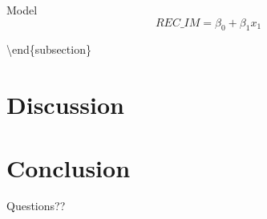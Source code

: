 \documentclass[
  ignorenonframetext,
]{beamer}
\begin{document}
\begin{frame}{Model}
\protect\hypertarget{model}{}
\[ REC\_IM = \beta_0 + \beta_1 x_1 \]

\textbackslash end\{subsection\}
\end{frame}

\hypertarget{discussion}{%
\section{Discussion}\label{discussion}}

\hypertarget{conclusion}{%
\section{Conclusion}\label{conclusion}}

\begin{frame}{}
\protect\hypertarget{section}{}
\begin{block}{}
\begin{center}
\Large{Questions??}
\end{center}
\end{block}
\end{frame}
\end{document}
